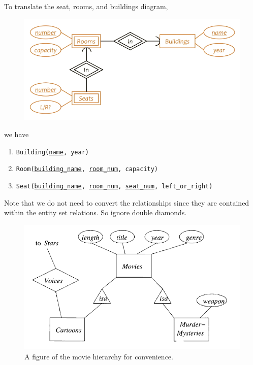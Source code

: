   \begin{example}
    To translate the seat, rooms, and buildings diagram, 
    \begin{figure}[H]
      \centering 
      \includegraphics[scale=0.4]{img/seat.png}
      \caption{} 
      \label{fig:seat}
    \end{figure}
    we have 
    \begin{enumerate}
      \item \texttt{Building(\underline{name}, year)} 
      \item \texttt{Room(\underline{building\_name}, \underline{room\_num}, capacity)}
      \item \texttt{Seat(\underline{building\_name}, \underline{room\_num}, \underline{seat\_num}, left\_or\_right)}
    \end{enumerate}
    Note that we do not need to convert the relationships since they are contained within the entity set relations. So ignore double diamonds. 
  \end{example}

  \begin{figure}[H]
    \centering 
    \includegraphics[scale=0.45]{img/movie_hierarchy.png}
    \caption{A figure of the movie hierarchy for convenience. } 
    \label{fig:movie_hierarchy}
  \end{figure}

